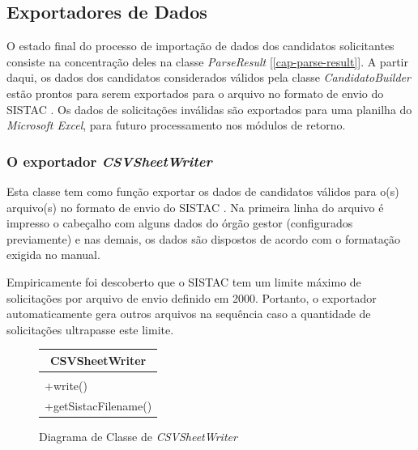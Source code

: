 \documentclass[
	12pt,			%
	openright,		%
	oneside,	
	a4paper,		%
	english,		%
	brazil			%
]{abntex2/abntex2}  %
\begin{document}
			\subsection{Exportadores de Dados}
	
				O estado final do processo de importação de dados dos candidatos solicitantes consiste na concentração deles na classe \textit{ParseResult} [\ref{cap-parse-result}]. A partir daqui, os dados dos candidatos considerados válidos pela classe \textit{CandidatoBuilder} estão prontos para serem exportados para o arquivo no formato de envio do SISTAC \cite{sistac-formatos}. Os dados de solicitações inválidas são exportados para uma planilha do \textit{Microsoft Excel}, para futuro processamento nos módulos de retorno.
	
				\subsubsection{O exportador \textit{CSVSheetWriter}}
	
					Esta classe tem como função exportar os dados de candidatos válidos para o(s) arquivo(s) no formato de envio do SISTAC \cite{sistac-formatos}. Na primeira linha do arquivo é impresso o cabeçalho com alguns dados do órgão gestor (configurados previamente) e nas demais, os dados são dispostos de acordo com o formatação exigida no manual.
	
					Empiricamente foi descoberto que o SISTAC tem um limite máximo de solicitações por arquivo de envio definido em 2000. Portanto, o exportador automaticamente gera outros arquivos na sequência caso a quantidade de solicitações ultrapasse este limite.
	
					\begin{figure}[h]
						\begin{center}
							
							\caption{Diagrama de Classe de \textit{CSVSheetWriter}}
							\label{csvwriter-uml}
							
							\begin{tabular}{|l|}
								\hline
								\multicolumn{1}{|c|}{\textbf{CSVSheetWriter}} \\ \hline
								\\ \hline
								+write()                                      \\
								+getSistacFilename()                          \\ \hline
							\end{tabular}
							
						\end{center}
					\end{figure}
	
\end{document}

